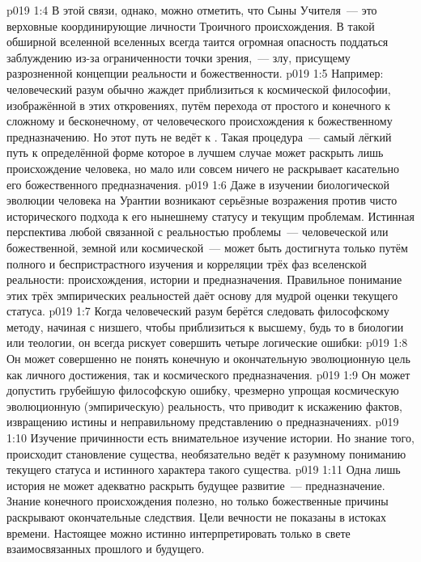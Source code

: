\vs p019 1:4 В этой связи, однако, можно отметить, что Сыны Учителя~--- это верховные координирующие личности Троичного происхождения. В такой обширной вселенной вселенных всегда таится огромная опасность поддаться заблуждению из\hyp{}за ограниченности точки зрения,~--- злу, присущему разрозненной концепции реальности и божественности.
\vs p019 1:5 Например: человеческий разум обычно жаждет приблизиться к космической философии, изображённой в этих откровениях, путём перехода от простого и конечного к сложному и бесконечному, от человеческого происхождения к божественному предназначению. Но этот путь не ведёт к . Такая процедура~--- самый лёгкий путь к определённой форме  которое в лучшем случае может раскрыть лишь происхождение человека, но мало или совсем ничего не раскрывает касательно его божественного предназначения.
\vs p019 1:6 Даже в изучении биологической эволюции человека на Урантии возникают серьёзные возражения против чисто исторического подхода к его нынешнему статусу и текущим проблемам. Истинная перспектива любой связанной с реальностью проблемы~--- человеческой или божественной, земной или космической~--- может быть достигнута только путём полного и беспристрастного изучения и корреляции трёх фаз вселенской реальности: происхождения, истории и предназначения. Правильное понимание этих трёх эмпирических реальностей даёт основу для мудрой оценки текущего статуса.
\vs p019 1:7 \pc Когда человеческий разум берётся следовать философскому методу, начиная с низшего, чтобы приблизиться к высшему, будь то в биологии или теологии, он всегда рискует совершить четыре логические ошибки:
\vs p019 1:8  Он может совершенно не понять конечную и окончательную эволюционную цель как личного достижения, так и космического предназначения.
\vs p019 1:9  Он может допустить грубейшую философскую ошибку, чрезмерно упрощая космическую эволюционную (эмпирическую) реальность, что приводит к искажению фактов, извращению истины и неправильному представлению о предназначениях.
\vs p019 1:10  Изучение причинности есть внимательное изучение истории. Но знание того,  происходит становление существа, необязательно ведёт к разумному пониманию текущего статуса и истинного характера такого существа.
\vs p019 1:11  Одна лишь история не может адекватно раскрыть будущее развитие~--- предназначение. Знание конечного происхождения полезно, но только божественные причины раскрывают окончательные следствия. Цели вечности не показаны в истоках времени. Настоящее можно истинно интерпретировать только в свете взаимосвязанных прошлого и будущего.
